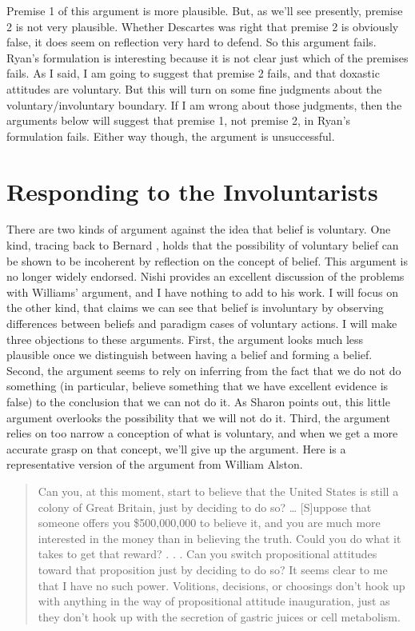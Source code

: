 \noindent Premise 1 of this argument is more plausible. But, as we'll see presently, premise 2 is not very plausible. Whether Descartes was right that premise 2 is obviously false, it does seem on reflection very hard to defend. So this argument fails. Ryan's formulation is interesting because it is not clear just which of the premises fails. As I said, I am going to suggest that premise 2 fails, and that doxastic attitudes are voluntary. But this will turn on some fine judgments about the voluntary/involuntary boundary. If I am wrong about those judgments, then the arguments below will suggest that premise 1, not premise 2, in Ryan's formulation fails. Either way though, the argument is unsuccessful.


\section{Responding to the Involuntarists} 

There are two kinds of argument against the idea that belief is voluntary. One kind, tracing back to Bernard \citet{WilliamsDecidingToBelieve}, holds that the possibility of voluntary belief can be shown to be incoherent by reflection on the concept of belief. This argument is no longer widely endorsed. Nishi \citet{Shah2002} provides an excellent discussion of the problems with Williams' argument, and I have nothing to add to his work. I will focus on the other kind, that claims we can see that belief is involuntary by observing differences between beliefs and paradigm cases of voluntary actions. I will make three objections to these arguments. First, the argument looks much less plausible once we distinguish between having a belief and forming a belief. Second, the argument seems to rely on inferring from the fact that we do not do something (in particular, believe something that we have excellent evidence is false) to the conclusion that we can not do it. As Sharon \citet{Ryan2003} points out, this little argument overlooks the possibility that we will\textit{ }not do it. Third, the argument relies on too narrow a conception of what is voluntary, and when we get a more accurate grasp on that concept, we'll give up the argument. Here is a representative version of the argument from William Alston.

\begin{quote}
Can you, at this moment, start to believe that the United States is still a colony of Great Britain, just by deciding to do so? {\dots} [S]uppose that someone offers you \$500,000,000 to believe it, and you are much more interested in the money than in believing the truth. Could you do what it takes to get that reward? . . . Can you switch propositional attitudes toward that proposition just by deciding to do so? It seems clear to me that I have no such power. Volitions, decisions, or choosings don't hook up with anything in the way of propositional attitude inauguration, just as they don't hook up with the secretion of gastric juices or cell metabolism. \cite[122]{Alston1988}
\end{quote}

